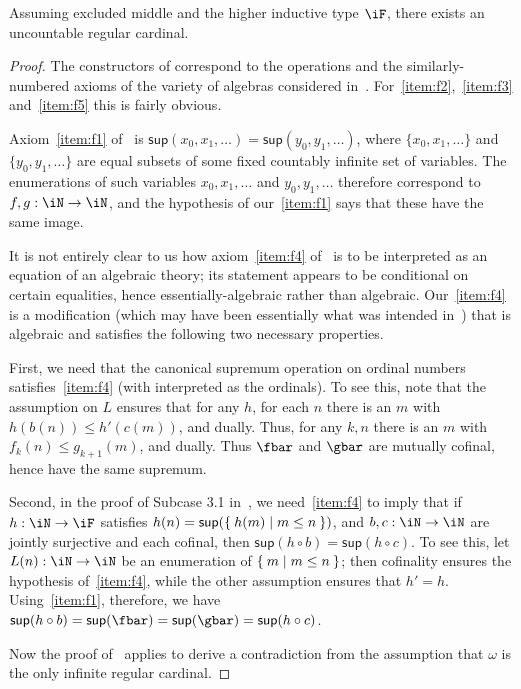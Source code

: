 \documentclass[referee]{psp}
\let\N\iN
\let\sec\S
\let\S\cS
\def\sup{\mathsf{sup}}
\begin{document}
\begin{thm}[{cf.\ \cite[\sec9]{blass:freealg}}]
  Assuming excluded middle and the higher inductive type $\iF$, there exists an uncountable regular cardinal.
\end{thm}
\begin{proof}
  The constructors of \iF correspond to the operations and the similarly-numbered axioms of the variety of algebras considered in~\cite[\sec9]{blass:freealg}.
  For~\ref{item:f2},~\ref{item:f3} and~\ref{item:f5} this is fairly obvious.

  Axiom~\ref{item:f1} of~\cite[\sec9]{blass:freealg} is $\sup(x_0,x_1,\dots) =\sup(y_0,y_1,\dots)$, where $\{x_0,x_1,\dots\}$ and $\{y_0,y_1,\dots\}$ are equal subsets of some fixed countably infinite set of variables.
  The enumerations of such variables $x_0,x_1,\dots$ and $y_0,y_1,\dots$ therefore correspond to $f,g:\N\to\N$, and the hypothesis of our~\ref{item:f1} says that these have the same image.

  It is not entirely clear to us how axiom~\ref{item:f4} of~\cite[\sec9]{blass:freealg} is to be interpreted as an equation of an algebraic theory; its statement appears to be conditional on certain equalities, hence essentially-algebraic rather than algebraic.
  Our~\ref{item:f4} is a modification (which may have been essentially what was intended in~\cite[\sec9]{blass:freealg}) that is algebraic and satisfies the following two necessary properties.

  First, we need that the canonical supremum operation on ordinal numbers satisfies~\ref{item:f4} (with \iF interpreted as the ordinals).
  To see this, note that the assumption on $L$ ensures that for any $h$, for each $n$ there is an $m$ with $h(b(n))\le h'(c(m))$, and dually.
  Thus, for any $k,n$ there is an $m$ with $f_k(n) \le g_{k+1}(m)$, and dually.
  Thus $\fbar$ and $\gbar$ are mutually cofinal, hence have the same supremum.

  Second, in the proof of Subcase 3.1 in~\cite[\sec9]{blass:freealg}, we need~\ref{item:f4} to imply that if $h:\N\to\iF$ satisfies $h(n) = \sup(\setof{ h(m) | m\le n})$, and $b,c:\N\to\N$ are jointly surjective and each cofinal, then $\sup(h\circ b)=\sup(h\circ c)$.
  To see this, let $L(n):\N\to\N$ be an enumeration of $\Set{m|m\le n}$; then cofinality ensures the hypothesis of~\ref{item:f4}, while the other assumption ensures that $h'=h$.
  Using~\ref{item:f1}, therefore, we have $\sup(h\circ b) = \sup(\fbar) = \sup(\gbar) = \sup(h\circ c)$.

  Now the proof of~\cite[\sec9]{blass:freealg} applies to derive a contradiction from the assumption that $\omega$ is the only infinite regular cardinal.
\end{proof}
\end{document}
